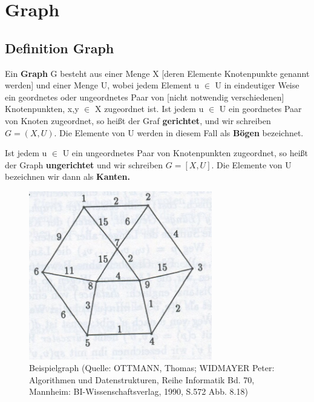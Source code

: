 
\chapter{Graph}

\section{Definition Graph}


\begin{theorem}
Ein \textbf{Graph} G besteht aus einer Menge X [deren Elemente Knotenpunkte genannt werden] und einer Menge U, wobei jedem Element u $\in$ U in eindeutiger Weise ein geordnetes oder ungeordnetes Paar von [nicht notwendig verschiedenen] Knotenpunkten, x,y $\in$ X zugeordnet ist.
Ist jedem u $\in$ U ein geordnetes Paar von Knoten zugeordnet, so heißt der Graf \textbf{gerichtet}, und wir schreiben 
	$G= (X, U)$.
Die Elemente von U werden in diesem Fall als \textbf{Bögen} bezeichnet.

Ist jedem u $\in$ U ein ungeordnetes Paar von Knotenpunkten zugeordnet, so heißt der Graph \textbf{ungerichtet} und wir schreiben 
	$G=[X,U]$. 
Die Elemente von U bezeichnen wir dann als \textbf{Kanten.} \\
\cite{Biess9}
\end{theorem} %

\begin{figure}[h]
\centering
\includegraphics[width = 8cm, bb=0 0 300 400]{./chapters/Graph.jpg}
\caption{Beispielgraph {\tiny (Quelle: OTTMANN, Thomas; WIDMAYER Peter: Algorithmen und Datenstrukturen, Reihe Informatik Bd. 70, Mannheim: BI-Wissenschaftsverlag, 1990, S.572 Abb. 8.18)} }
\label{a1}
\end{figure}


